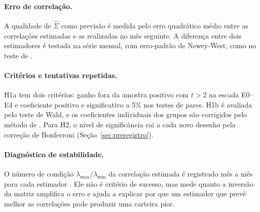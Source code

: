 \paragraph{Erro de correlação.} A qualidade de $\hat\Sigma$ como previsão é medida pelo erro quadrático
médio entre as correlações estimadas e as realizadas no mês seguinte. A diferença entre dois estimadores
é testada na série mensal, com erro-padrão de Newey-West, como no teste de \citet{diebold1995}.

\paragraph{Critérios e tentativas repetidas.} H1a tem dois critérios: ganho fora da amostra positivo com
$t>2$ na escada E0--E4 e coeficiente positivo e significativo a 5\% nos testes de pares. H1b é avaliada
pelo teste de Wald, e os coeficientes individuais dos grupos são corrigidos pelo método de
\citet{benjamini1995}. Para H2, o nível de significância cai a cada novo desenho pela correção de
Bonferroni (Seção~\ref{sec:preregistro}).

\paragraph{Diagnóstico de estabilidade.} O número de condição $\lambda_{\max}/\lambda_{\min}$ da correlação
estimada é registrado mês a mês para cada estimador \citep{lopezdeprado2016}. Ele não é critério de
sucesso, mas mede quanto a inversão da matriz amplifica o erro e ajuda a explicar por que um estimador
que prevê melhor as correlações pode produzir uma carteira pior.

\clearpage
